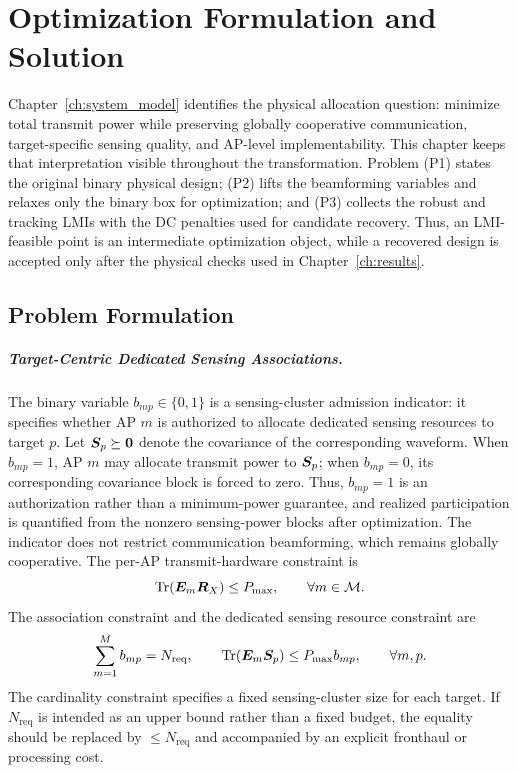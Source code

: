 \chapter{Optimization Formulation and Solution}\label{ch:solution_method}

Chapter~\ref{ch:system_model} identifies the physical allocation question:
minimize total transmit power while preserving globally cooperative
communication, target-specific sensing quality, and AP-level implementability.
This chapter keeps that interpretation visible throughout the transformation.
Problem (P1) states the original binary physical design; (P2) lifts the
beamforming variables and relaxes only the binary box for optimization; and
(P3) collects the robust and tracking LMIs with the DC penalties used for
candidate recovery. Thus, an LMI-feasible point is an intermediate optimization
object, while a recovered design is accepted only after the physical checks
used in Chapter~\ref{ch:results}.

\section{Problem Formulation}\label{sec:formulation}

\paragraph{Target-Centric Dedicated Sensing Associations.}
The binary variable $b_{mp}\in\{0,1\}$ is a sensing-cluster admission indicator: it specifies whether AP $m$ is authorized to allocate dedicated sensing resources to target $p$. Let $\bm{S}_p\succeq\bm{0}$ denote the covariance of the corresponding waveform. When $b_{mp}=1$, AP $m$ may allocate transmit power to $\bm{S}_p$; when $b_{mp}=0$, its corresponding covariance block is forced to zero. Thus, $b_{mp}=1$ is an authorization rather than a minimum-power guarantee, and realized participation is quantified from the nonzero sensing-power blocks after optimization. The indicator does not restrict communication beamforming, which remains globally cooperative. The per-AP transmit-hardware constraint is
\begin{equation}
    \operatorname{Tr}(\bm{E}_m\bm{R}_X)\leq P_{\max},\qquad \forall m\in\mathcal{M}.
\end{equation}
The association constraint and the dedicated sensing resource constraint are
\begin{equation}
\sum_{m=1}^{M}b_{mp}=N_{\mathrm{req}},\qquad
\operatorname{Tr}(\bm{E}_m\bm{S}_p)\leq P_{\max}b_{mp},\qquad \forall m,p.
\end{equation}
The cardinality constraint specifies a fixed sensing-cluster size for each target. If $N_{\mathrm{req}}$ is intended as an upper bound rather than a fixed budget, the equality should be replaced by $\leq N_{\mathrm{req}}$ and accompanied by an explicit fronthaul or processing cost.

